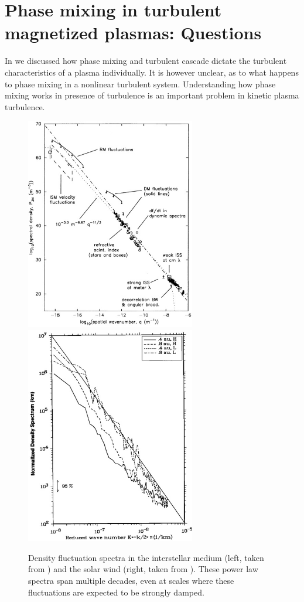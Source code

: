\section{Phase mixing in turbulent magnetized plasmas: Questions}
    
    In  we discussed how phase mixing
    and turbulent cascade dictate the turbulent characteristics of a plasma individually. It is
    however unclear, as to
    what happens to phase mixing in a nonlinear turbulent system. Understanding how phase
    mixing works in presence of turbulence is an important problem in kinetic plasma
    turbulence.

     \begin{figure}
     \begin{center}
        \includegraphics[width=7.4cm]{figs/intro/Armstrong_dens.jpg}
        \includegraphics[width=7.4cm]{figs/intro/solarwind_dens.jpg}
        \caption{Density fluctuation spectra in the interstellar medium (left, taken from
        \cite{armstrong95}) and the solar wind (right, taken from \cite{marsch90}). These power law
        spectra span multiple decades, even at scales where these fluctuations are
        expected to be strongly damped.}
        \label{intro:fig:dnespec}
     \end{center}
     \end{figure}

